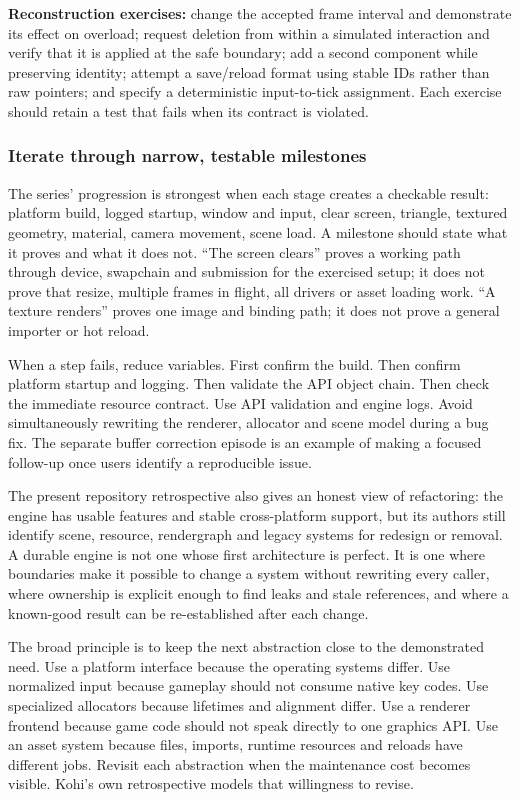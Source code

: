 \textbf{Reconstruction exercises:} change the accepted frame interval and demonstrate its effect on overload; request deletion from within a simulated interaction and verify that it is applied at the safe boundary; add a second component while preserving identity; attempt a save/reload format using stable IDs rather than raw pointers; and specify a deterministic input-to-tick assignment. Each exercise should retain a test that fails when its contract is violated.

\subsubsection{Iterate through narrow, testable milestones}\label{iterate-through-narrow-testable-milestones}

The series' progression is strongest when each stage creates a checkable result: platform build, logged startup, window and input, clear screen, triangle, textured geometry, material, camera movement, scene load. A milestone should state what it proves and what it does not. ``The screen clears'' proves a working path through device, swapchain and submission for the exercised setup; it does not prove that resize, multiple frames in flight, all drivers or asset loading work. ``A texture renders'' proves one image and binding path; it does not prove a general importer or hot reload.

When a step fails, reduce variables. First confirm the build. Then confirm platform startup and logging. Then validate the API object chain. Then check the immediate resource contract. Use API validation and engine logs. Avoid simultaneously rewriting the renderer, allocator and scene model during a bug fix. The separate buffer correction episode is an example of making a focused follow-up once users identify a reproducible issue.

The present repository retrospective also gives an honest view of refactoring: the engine has usable features and stable cross-platform support, but its authors still identify scene, resource, rendergraph and legacy systems for redesign or removal. A durable engine is not one whose first architecture is perfect. It is one where boundaries make it possible to change a system without rewriting every caller, where ownership is explicit enough to find leaks and stale references, and where a known-good result can be re-established after each change.

The broad principle is to keep the next abstraction close to the demonstrated need. Use a platform interface because the operating systems differ. Use normalized input because gameplay should not consume native key codes. Use specialized allocators because lifetimes and alignment differ. Use a renderer frontend because game code should not speak directly to one graphics API. Use an asset system because files, imports, runtime resources and reloads have different jobs. Revisit each abstraction when the maintenance cost becomes visible. Kohi's own retrospective models that willingness to revise.

